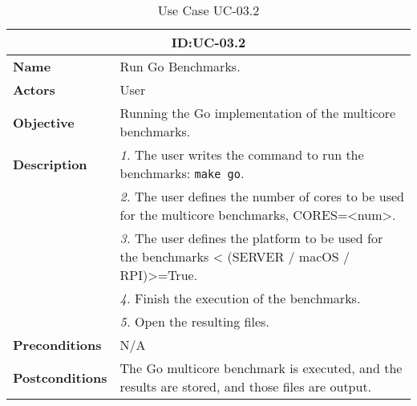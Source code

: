 \begin{table}[H]
    \centering
    \begin{tabular}{l p{10cm}}
        \toprule
        \multicolumn{2}{c}{\textbf{ID:\@ UC-03.2}} \\
        \toprule
        \textbf{Name}                         &  Run Go Benchmarks. \\
        \textbf{Actors}                       &  User \\
        \textbf{Objective}                    &  Running the Go implementation of the multicore benchmarks. \\
        \multirow{1}{*}{\textbf{Description}} & \textsl{1.} The user writes the command to run the benchmarks: \texttt{make go}.\\
                                              & \textsl{2.} The user defines the number of cores to be used for the multicore benchmarks, CORES=<num>.\\
                                              & \textsl{3.} The user defines the platform to be used for the benchmarks < (SERVER / macOS / RPI)>=True.\\
                                              & \textsl{4.} Finish the execution of the benchmarks.\\
                                              & \textsl{5.} Open the resulting files.\\
        \textbf{Preconditions}                &  N/A \\
        \textbf{Postconditions}               &  The Go multicore benchmark is executed, and the results are stored, and those files are output. \\
    \end{tabular}
    \caption{Use Case UC-03.2}\label{tab:uc-03.2}
\end{table}


